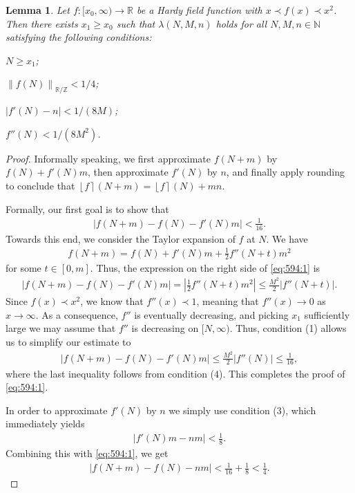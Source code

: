\documentclass{amsart}
\newtheorem{lemma}[theorem]{Lemma}
\theoremstyle{definition}
\newcommand{\nint}[1]{\left\lfloor #1 \right\rceil}
\newcommand{\fpa}[1]{\left\lVert #1 \right\rVert_{\RR/\ZZ}}
\newcommand{\abs}[1]{\left|#1\right|}
\newcommand{\NN}{\mathbb{N}}
\newcommand{\ZZ}{\mathbb{Z}}
\newcommand{\RR}{\mathbb{R}}
\begin{document}
\begin{lemma}
\label{lem:lambda-conditions-new}
	Let $f \colon [x_0,\infty) \to \RR$ be a Hardy field function with $x \prec f(x) \prec x^2$. Then there exists $x_1 \geq x_0$ such that $\lambda(N,M,n)$ holds for all $N,M,n \in \NN$ satisfying the following conditions:
\begin{inparaenum}
\item $N \geq x_1$;
\item $\fpa{f(N)} < 1/4$;
\item $\abs{f'(N) - n} < 1/(8M)$;
\item $f''(N) < 1/(8 M^2)$.
\end{inparaenum}
\end{lemma}
\begin{proof}
Informally speaking, we first approximate $f(N+m)$ by $f(N) + f'(N)m$, then approximate $f'(N)$ by $n$, and finally apply rounding to conclude that $\nint{f}(N+m) = \nint{f}(N) + mn$. 

Formally, our first goal is to show that 
\begin{align}\label{eq:594:1}
	\abs{f(N+m) - f(N) - f'(N)m} < \frac{1}{16}.
\end{align}
Towards this end, we consider the Taylor expansion of $f$ at $N$. We have 
\begin{align*}
	f(N+m) = f(N) + f'(N)m + \frac{1}{2} f''(N+t)m^2
\end{align*}
for some $t \in [0,m]$. Thus, the expression on the right side of \eqref{eq:594:1} is
\begin{align*}
	\abs{f(N+m) - f(N) - f'(N)m} = \abs{ \frac{1}{2} f''(N+t)m^2} \leq \frac{M^2}{2} \abs{f''(N+t)}.
\end{align*}
Since $f(x) \prec x^2$, we know that $f''(x) \prec 1$, meaning that $f''(x) \to 0$ as $x \to \infty$. As a consequence, $f''$ is eventually decreasing, and picking $x_1$ sufficiently large we may assume that $f''$ is decreasing on $[N,\infty)$. Thus, condition (1) allows us to simplify our estimate to
\begin{align*}
\abs{f(N+m) - f(N) - f'(N)m} \leq \frac{M^2}{2} \abs{f''(N)} \leq \frac{1}{16},
\end{align*}
where the last inequality follows from condition (4). This completes the proof of \eqref{eq:594:1}.

In order to approximate $f'(N)$ by $n$ we simply use condition (3), which immediately yields
\begin{align*}
	\abs{f'(N)m - nm} < \frac{1}{8}.
\end{align*}
Combining this with \eqref{eq:594:1}, we get
\begin{align}\label{eq:594:3}
	\abs{f(N+m) - f(N) - nm} < \frac{1}{16} + \frac{1}{8} < \frac{1}{4}.
\end{align}


\end{proof}
\end{document}
